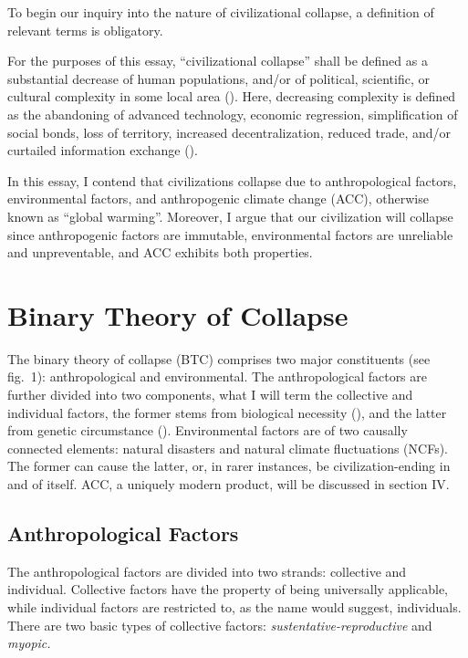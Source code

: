 
To begin our inquiry into the nature of civilizational collapse, a definition of relevant terms is obligatory. 

For the purposes of this essay, “civilizational collapse” shall be defined as a substantial decrease of human populations, and/or of political, scientific, or cultural complexity in some local area (\cite[p.\ 363]{diamond1994ecological}). Here, decreasing complexity is defined as the abandoning of advanced technology, economic regression, simplification of social bonds, loss of territory, increased decentralization, reduced trade, and/or curtailed information exchange (\cites[chap.\ 1]{tainter1988collapse}{tainter2023lecture}).

In this essay, I contend that civilizations collapse due to anthropological factors, environmental factors, and anthropogenic climate change (ACC), otherwise known as “global warming”. Moreover, I argue that our civilization will collapse since anthropogenic factors are immutable, environmental factors are unreliable and unpreventable, and ACC exhibits both properties. 

\section{Binary Theory of Collapse}

The binary theory of collapse (BTC) comprises two major constituents (see fig.\ 1): anthropological and environmental. The anthropological factors are further divided into two components, what I will term the collective and individual factors, the former stems from biological necessity (\cite[p.\ 13]{santos2015evolutionary}), and the latter from genetic circumstance (\cites[p.\ 8]{goriounova2019genes}[pp.\ 1–3]{wu2020genetic}). Environmental factors are of two causally connected elements: natural disasters and natural climate fluctuations (NCFs). The former can cause the latter, or, in rarer instances, be civilization-ending in and of itself. ACC, a uniquely modern product, will be discussed in section IV. 

\subsection{Anthropological Factors}

The anthropological factors are divided into two strands: collective and individual. Collective factors have the property of being universally applicable, while individual factors are restricted to, as the name would suggest, individuals. There are two basic types of collective factors: \emph{sustentative-reproductive} and \emph{myopic.}

